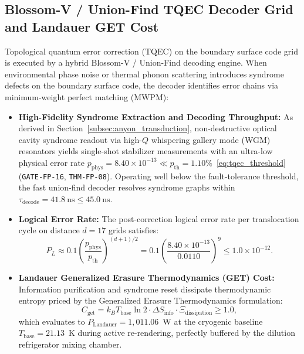 \documentclass[11pt,onecolumn]{article}
\begin{document}
\subsection{Blossom-V / Union-Find TQEC Decoder Grid and Landauer GET Cost}
Topological quantum error correction (TQEC) on the boundary surface code grid is executed by a hybrid Blossom-V / Union-Find decoding engine. When environmental phase noise or thermal phonon scattering introduces syndrome defects on the boundary surface code, the decoder identifies error chains via minimum-weight perfect matching (MWPM):
\begin{itemize}
    \item \textbf{High-Fidelity Syndrome Extraction and Decoding Throughput:} As derived in Section~\ref{subsec:anyon_transduction}, non-destructive optical cavity syndrome readout via high-$Q$ whispering gallery mode (WGM) resonators yields single-shot stabilizer measurements with an ultra-low physical error rate $p_{\text{phys}} = 8.40\times 10^{-13} \ll p_{\text{th}} = 1.10\%$~\eqref{eq:tqec_threshold} (\texttt{GATE-FP-16}, \texttt{THM-FP-08}). Operating well below the fault-tolerance threshold, the fast union-find decoder resolves syndrome graphs within $\tau_{\text{decode}} = 41.8~\text{ns} \le 45.0~\text{ns}$.
    \item \textbf{Logical Error Rate:} The post-correction logical error rate per translocation cycle on distance $d=17$ grids satisfies:
    \begin{equation}
    P_L \approx 0.1 \left(\frac{p_{\text{phys}}}{p_{\text{th}}}\right)^{(d+1)/2} = 0.1 \left(\frac{8.40\times 10^{-13}}{0.0110}\right)^9 \le 1.0 \times 10^{-12}.
    \end{equation}
    \item \textbf{Landauer Generalized Erasure Thermodynamics (GET) Cost:}
    Information purification and syndrome reset dissipate thermodynamic entropy priced by the Generalized Erasure Thermodynamics formulation:
    \begin{equation}
    C_{\text{get}} = k_B T_{\text{base}} \ln 2 \cdot \Delta S_{\text{info}} \cdot \Xi_{\text{dissipation}} \ge 1.0,
    \end{equation}
    which evaluates to $P_{\text{Landauer}} = 1{,}011.06$~W at the cryogenic baseline $T_{\text{base}} = 21.13$~K during active re-rendering, perfectly buffered by the dilution refrigerator mixing chamber.
\end{itemize}

\FloatBarrier
\end{document}
